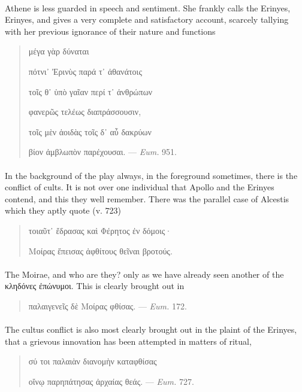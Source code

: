 \documentclass[a4paper, 11pt, oneside, polutonikogreek, english]{article}
\begin{document}
\paragraph{}
Athene is less guarded in speech and sentiment. She frankly calls the Erinyes, Erinyes, and gives a very complete and satisfactory account, scarcely tallying with her previous ignorance of their nature and functions
\begin{quotation}
\hspace*{20mm}μέγα γὰρ δύναται

πότνι᾽ Ἐρινὺς παρά τ᾽ ἀθανάτοις

τοῖς θ᾽ ὑπὸ γαῖαν περί τ᾿ ἀνθρώπων

φανερῶς τελέως διαπράσσουσιν,

τοῖς μὲν ἀοιδὰς τοῖς δ᾽ αὖ δακρύων

βίον ἀμβλωπὸν παρέχουσαι. --- \emph{Eum.} 951.
\end{quotation}
\paragraph{}
In the background of the play always, in the foreground sometimes, there is the conflict of cults. It is not over one individual that Apollo and the Erinyes contend, and this they well remember. There was the parallel case of Alcestis which they aptly quote (v. 723)
\begin{quotation}
τοιαῦτ᾽ ἔδρασας καὶ Φέρητος ἐν δόμοις·

Μοίρας ἔπεισας ἀφθίτους θεῖναι βροτούς.
\end{quotation}
\paragraph{}
The Moirae, and who are they? only as we have already seen another of the κληδόνες ἐπώνυμοι. This is clearly brought out in
\begin{quotation}
παλαιγενεῖς δὲ Μοίρας φθίσας. --- \emph{Eum.} 172.
\end{quotation}
\paragraph{}
The cultus conflict is also most clearly brought out in the plaint of the Erinyes, that a grievous innovation has been attempted in matters of ritual,
\begin{quotation}
σύ τοι παλαιὰν διανομὴν καταφθίσας

οἴνῳ παρηπάτησας ἀρχαίας θεάς. --- \emph{Eum.} 727.
\end{quotation}
\end{document}
